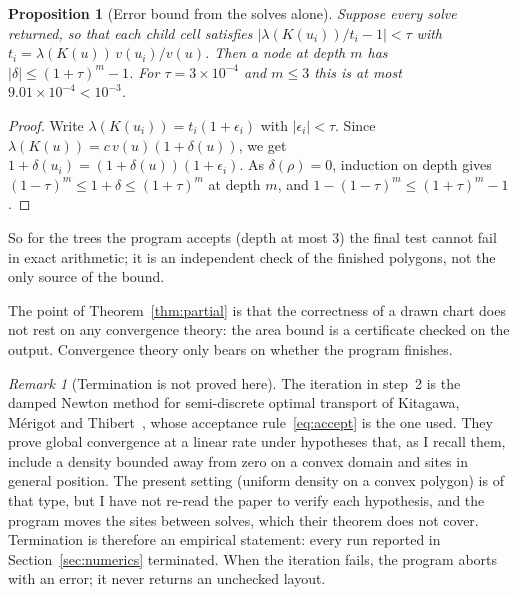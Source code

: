 \documentclass[11pt,a4paper]{article}
\theoremstyle{plain}
\newtheorem{proposition}[theorem]{Proposition}
\theoremstyle{definition}
\theoremstyle{remark}
\newtheorem{remark}[theorem]{Remark}
\newcommand{\area}{\lambda}
\begin{document}
\begin{proposition}[Error bound from the solves alone]\label{prop:apriori}
Suppose every solve returned, so that each child cell satisfies
$\lvert\area(K(u_i))/t_i-1\rvert<\tau$ with
$t_i=\area(K(u))\,v(u_i)/v(u)$. Then a node at depth $m$ has
$\lvert\delta\rvert\le(1+\tau)^m-1$. For $\tau=3\times10^{-4}$ and $m\le3$ this
is at most $9.01\times10^{-4}<10^{-3}$.
\end{proposition}
\begin{proof}
Write $\area(K(u_i))=t_i(1+\epsilon_i)$ with $\lvert\epsilon_i\rvert<\tau$.
Since $\area(K(u))=c\,v(u)(1+\delta(u))$, we get
$1+\delta(u_i)=(1+\delta(u))(1+\epsilon_i)$. As $\delta(\rho)=0$, induction on
depth gives $(1-\tau)^m\le1+\delta\le(1+\tau)^m$ at depth $m$, and
$1-(1-\tau)^m\le(1+\tau)^m-1$.
\end{proof}

So for the trees the program accepts (depth at most $3$) the final test cannot
fail in exact arithmetic; it is an independent check of the finished polygons,
not the only source of the bound.

The point of Theorem~\ref{thm:partial} is that the correctness of a drawn
chart does not rest on any convergence theory: the area bound is a
certificate checked on the output. Convergence theory only bears on whether
the program finishes.

\begin{remark}[Termination is not proved here]\label{rem:termination}
The iteration in step~2 is the damped Newton method for semi-discrete optimal
transport of Kitagawa, M\'erigot and Thibert~\cite{KMT}, whose acceptance
rule~\eqref{eq:accept} is the one used. They prove global convergence at a
linear rate under hypotheses that, as I recall them, include a density
bounded away from zero on a convex domain and sites in general position. The
present setting (uniform density on a convex polygon) is of that type, but I
have not re-read the paper to verify each hypothesis, and the program moves
the sites between solves, which their theorem does not cover. Termination is
therefore an empirical statement: every run reported in
Section~\ref{sec:numerics} terminated. When the iteration fails, the program
aborts with an error; it never returns an unchecked layout.
\end{remark}
\end{document}
